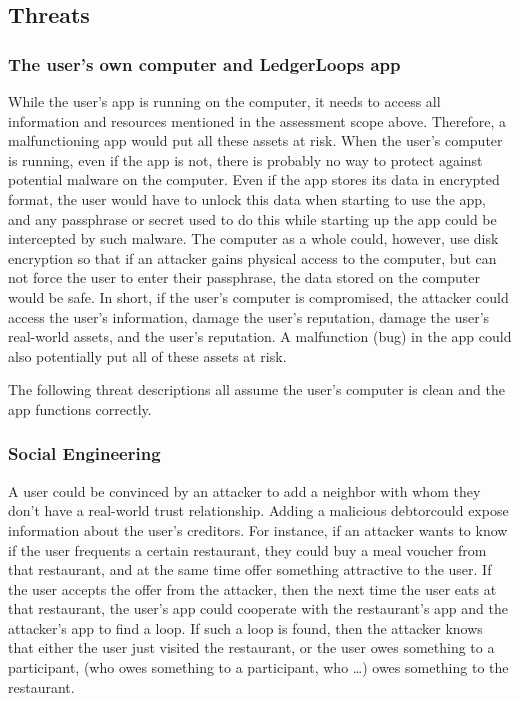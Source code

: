 \documentclass[11pt,twoside,a4paper]{article}
\begin{document}
\subsection{Threats}
\subsubsection{The user's own computer and LedgerLoops app}
While the user's app is running on the computer, it needs to access all information and resources mentioned in the assessment scope above. Therefore, a malfunctioning app would put all these assets at risk. When the user's computer is running, even if the app is not, there is probably no way to protect against potential malware on the computer. Even if the app stores its data in encrypted format, the user would have to unlock this data when starting to use the app, and any passphrase or secret used to do this while starting up the app could be intercepted by such malware. The computer as a whole could, however, use disk encryption so that if an attacker gains physical access to the computer, but can not force the user to enter their passphrase, the data stored on the computer would be safe. In short, if the user's computer is compromised, the attacker could access the user's information, damage the user's reputation, damage the user's real-world assets, and the user's reputation. A malfunction (bug) in the app could also potentially put all of these assets at risk.

The following threat descriptions all assume the user's computer is clean and the app functions correctly.

\subsubsection{Social Engineering}
A user could be convinced by an attacker to add a neighbor with whom they don't have a real-world trust relationship. Adding a malicious debtorcould expose information about the user's creditors. For instance, if an attacker wants to know if the user frequents a certain restaurant, they could buy a meal voucher from that restaurant, and at the same time offer something attractive to the user. If the user accepts the offer from the attacker, then the next time the user eats at that restaurant, the user's app could cooperate with the restaurant's app and the attacker's app to find a loop. If such a loop is found, then the attacker knows that either the user just visited the restaurant, or the user owes something to a participant, (who owes something to a participant, who \ldots) owes something to the restaurant.
\end{document}
